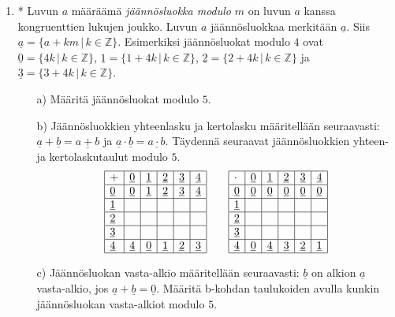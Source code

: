 \begin{enumerate}
\item * %
Luvun $a$ määräämä {\em jäännösluokka modulo} $m$ on luvun $a$ kanssa kongruenttien lukujen joukko. Luvun $a$ jäännösluokkaa merkitään $\underline{a}$. Siis $\underline{a} = \{a + km\, |\, k\in \mathbb{Z}\}$. Esimerkiksi jäännösluokat modulo $4$ ovat $\underline{0}=\{4k\, |\, k\in \mathbb{Z}\}$, $\underline{1}=\{1+4k\, |\, k\in \mathbb{Z}\}$, $\underline{2}=\{2+4k\, |\, k\in \mathbb{Z}\}$ ja $\underline{3}=\{3+4k\, |\, k\in \mathbb{Z}\}$.
\begin{itemize}
\item[a)] Määritä jäännösluokat modulo $5$.
\item[b)] Jäännösluokkien yhteenlasku ja kertolasku määritellään seuraavasti: $\underline{a} + \underline{b} = \underline{a + b}$ ja $\underline{a} \cdot \underline{b} = \underline{a\cdot b}$. Täydennä seuraavat jäännösluokkien yhteen- ja kertolaskutaulut modulo $5$.
\[
\begin{array}{|l|l|l|l|l|l|}
\hline
+& \underline{0} & \underline{1} & \underline{2} & \underline{3} & \underline{4} \\ \hline
\underline{0} & \underline{0} & \underline{1} & \underline{2} &  \underline{3} & \underline{4}  
\\ \hline
 \underline{1} &&&&& \\ \hline
 \underline{2} &&&&& \\ \hline
 \underline{3} &&&&& \\ \hline
\underline{4} & \underline{4} & \underline{0} & \underline{1} &  \underline{2} & \underline{3}  
\\ \hline
\end{array}
\qquad
\begin{array}{|l|l|l|l|l|l|}
\hline
\cdot& \underline{0} & \underline{1} & \underline{2} & \underline{3} & \underline{4} \\ \hline
\underline{0} & \underline{0} & \underline{0} & \underline{0} &  \underline{0} & \underline{0}  
\\ \hline
 \underline{1} &&&&& \\ \hline
 \underline{2} &&&&& \\ \hline
 \underline{3} &&&&& \\ \hline
\underline{4} & \underline{0} & \underline{4} & \underline{3} &  \underline{2} & \underline{1}  
\\ \hline
\end{array}
\]
\item[c)] Jäännösluokan vasta-alkio määritellään seuraavasti: $\underline{b}$ on alkion $\underline{a}$ vasta-alkio, jos $\underline{a} + \underline{b} = \underline{0}$. Määritä b-kohdan  taulukoiden avulla kunkin jäännösluokan vasta-alkiot modulo $5$.

\end{itemize}
\end{enumerate}
